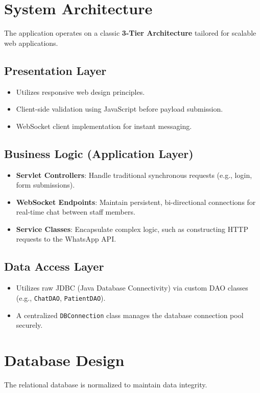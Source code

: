 \documentclass[12pt,a4paper]{article}
\begin{document}
\section{System Architecture}
The application operates on a classic \textbf{3-Tier Architecture} tailored for scalable web applications.

\subsection{Presentation Layer}
\begin{itemize}
    \item Utilizes responsive web design principles.
    \item Client-side validation using JavaScript before payload submission.
    \item WebSocket client implementation for instant messaging.
\end{itemize}

\subsection{Business Logic (Application Layer)}
\begin{itemize}
    \item \textbf{Servlet Controllers}: Handle traditional synchronous requests (e.g., login, form submissions).
    \item \textbf{WebSocket Endpoints}: Maintain persistent, bi-directional connections for real-time chat between staff members.
    \item \textbf{Service Classes}: Encapsulate complex logic, such as constructing HTTP requests to the WhatsApp API.
\end{itemize}

\subsection{Data Access Layer}
\begin{itemize}
    \item Utilizes raw JDBC (Java Database Connectivity) via custom DAO classes (e.g., \texttt{ChatDAO}, \texttt{PatientDAO}).
    \item A centralized \texttt{DBConnection} class manages the database connection pool securely.
\end{itemize}

\section{Database Design}
The relational database is normalized to maintain data integrity.
\end{document}
